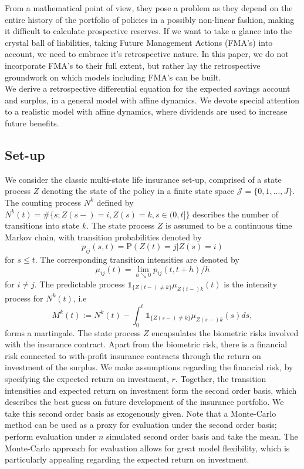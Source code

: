 \documentclass[12pt]{article}
\newcommand{\indic}[1]{\mathds{1}_{ \{ #1 \} }}
\renewcommand{\P}{\text{P}}
\theoremstyle{my_thm}
\begin{document}
From a mathematical point of view, they pose a problem as they depend on the entire history of the portfolio of policies in a possibly non-linear fashion, making it difficult to calculate prospective reserves. If we want to take a glance into the crystal ball of liabilities, taking Future Management Actions (FMA's) into account, we need to embrace it's retrospective nature. In this paper, we do not incorporate FMA's to their full extent, but rather lay the retrospective groundwork on which models including FMA's can be built.
\\[12pt]
We derive a retrospective differential equation for the expected savings account and surplus, in a general model with affine dynamics. We devote special attention to a realistic model with affine dynamics, where dividends are used to increase future benefits. 




\subsection{Set-up}
We consider the classic multi-state life insurance set-up, comprised of a state process $Z$ denoting the state of the policy in a finite state space $\mathcal{J}=\{0,1,...,J\}$. The counting process $N^{k}$ defined by $N^{k}(t)=\# \{ s; Z(s-)= i, Z(s)=k, s \in (0,t] \}$ describes the number of transitions into state $k$.  The state process $Z$ is assumed to be a continuous time Markov chain, with transition probabilities denoted by
$$
p_{ij}(s,t)= \P(Z(t)=j|Z(s)=i)
$$
for $s\leq t$. The corresponding transition intensities are denoted by
$$
\mu_{ij}(t)=\lim_{h \searrow 0} p_{ij}(t,t+h)/h
$$
for $i \neq j$. The predictable process $ \indic{Z(t-)\neq k }\mu_{Z(t-)k}(t)$ is the intensity process for $N^{k}(t)$, i.e
$$
M^{k}(t):=N^k(t)-\int_0^t \indic{Z(s-)\neq k } \mu_{Z(s-)k}(s) ds,
$$
forms a martingale. The state process $Z$ encapsulates the biometric risks involved with the insurance contract. Apart from the biometric risk, there is a financial risk connected to with-profit insurance contracts through the return on investment of the surplus. We make assumptions regarding the financial risk, by specifying the expected return on investment, $r$. Together, the transition intensities and expected return on investment form the second order basis, which describes the best guess on future development of the insurance portfolio. We take this second order basis as exogenously given. Note that a Monte-Carlo method can be used as a proxy for evaluation under the second order basis; perform evaluation under $n$ simulated second order basis and take the mean. The Monte-Carlo approach for evaluation allows for great model flexibility, which is particularly appealing regarding the expected return on investment. 
\end{document}
